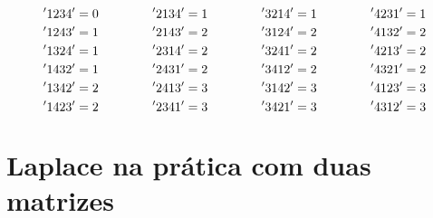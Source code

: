 \documentclass{article}
\begin{document}
    \[ '1234' = 0 \hspace{1.5cm} '2134' = 1 \hspace{1.5cm} '3214' = 1 \hspace{1.5cm} '4231' = 1\] 
    \[ '1243' = 1 \hspace{1.5cm} '2143' = 2 \hspace{1.5cm} '3124' = 2 \hspace{1.5cm} '4132' = 2\] 
    \[ '1324' = 1 \hspace{1.5cm} '2314' = 2 \hspace{1.5cm} '3241' = 2 \hspace{1.5cm} '4213' = 2\] 
    \[ '1432' = 1 \hspace{1.5cm} '2431' = 2 \hspace{1.5cm} '3412' = 2 \hspace{1.5cm} '4321' = 2\]
    \[ '1342' = 2 \hspace{1.5cm} '2413' = 3 \hspace{1.5cm} '3142' = 3 \hspace{1.5cm} '4123' = 3\] 
    \[ '1423' = 2 \hspace{1.5cm} '2341' = 3 \hspace{1.5cm} '3421' = 3 \hspace{1.5cm} '4312' = 3\] 
    
    \section {Laplace na prática com duas matrizes}
    
\end{document}
